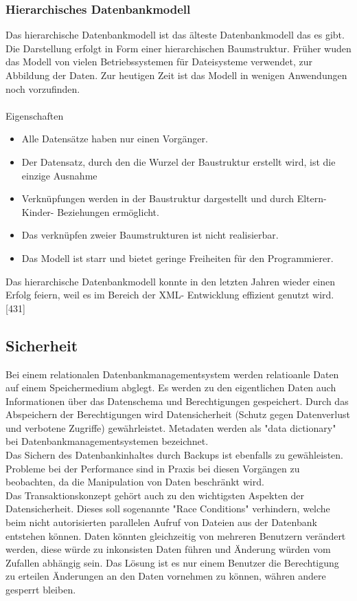 \documentclass[12pt,a4paper]{report}
\begin{document}
\begin{onehalfspace}
\subsubsection{Hierarchisches Datenbankmodell}
Das hierarchische Datenbankmodell ist das älteste Datenbankmodell das es gibt. Die Darstellung erfolgt in Form einer hierarchischen Baumstruktur. Früher wuden das Modell von vielen Betriebssystemen für Dateisysteme verwendet, zur Abbildung der Daten. Zur heutigen Zeit ist das Modell in wenigen Anwendungen noch vorzufinden.\\
\\Eigenschaften
\begin{itemize}
\item Alle Datensätze haben nur einen Vorgänger.
\item Der Datensatz, durch den die Wurzel der Baustruktur erstellt wird, ist die einzige Ausnahme
\item Verknüpfungen werden in der Baustruktur dargestellt und durch Eltern- Kinder- Beziehungen ermöglicht.
\item Das verknüpfen zweier Baumstrukturen ist nicht realisierbar.
\item Das Modell ist starr und bietet geringe Freiheiten für den Programmierer.
\end{itemize}
Das hierarchische Datenbankmodell konnte in den letzten Jahren wieder einen Erfolg feiern, weil es im Bereich der XML- Entwicklung effizient genutzt wird. [431]

\subsection{Sicherheit}
Bei einem relationalen Datenbankmanagementsystem werden relatioanle Daten auf einem Speichermedium abglegt. Es werden zu den eigentlichen Daten auch Informationen über das Datenschema und Berechtigungen gespeichert. Durch das Abspeichern der Berechtigungen wird Datensicherheit (Schutz gegen Datenverlust und verbotene Zugriffe) gewährleistet. Metadaten werden als "{}data dictionary"{} bei Datenbankmanagementsystemen bezeichnet.\\

Das Sichern des Datenbankinhaltes durch Backups ist ebenfalls zu gewähleisten. Probleme bei der Performance sind in Praxis bei diesen Vorgängen zu beobachten, da die Manipulation von Daten beschränkt wird.\\

Das Transaktionskonzept gehört auch zu den wichtigsten Aspekten der Datensicherheit. Dieses soll sogenannte "{}Race Conditions"{} verhindern, welche beim nicht autorisierten parallelen Aufruf von Dateien aus der Datenbank entstehen können. Daten könnten gleichzeitig von mehreren Benutzern verändert werden, diese würde zu inkonsisten Daten führen und Änderung würden vom Zufallen abhängig sein. Das Lösung ist es nur einem Benutzer die Berechtigung zu erteilen Änderungen an den Daten vornehmen zu können, währen andere gesperrt bleiben.\\


\end{onehalfspace}
\end{document}
